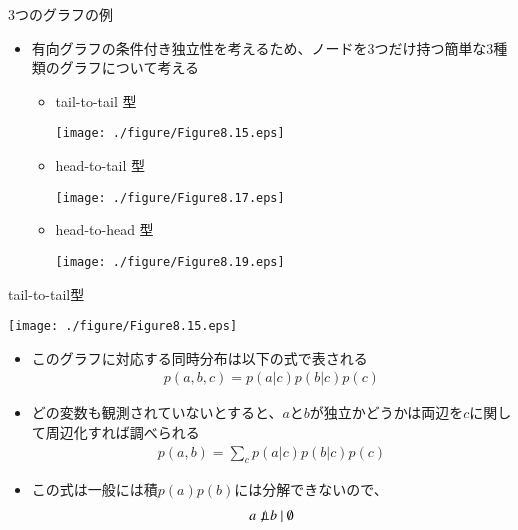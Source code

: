 \begin{frame}{3つのグラフの例}
 \begin{itemize}
  \item 有向グラフの条件付き独立性を考えるため、ノードを3つだけ持つ簡単な3種類のグラフについて考える
        \begin{itemize}
         \item tail-to-tail 型

               \texttt{[image: ./figure/Figure8.15.eps]}

         \item head-to-tail 型

               \texttt{[image: ./figure/Figure8.17.eps]}

         \item head-to-head 型

               \texttt{[image: ./figure/Figure8.19.eps]}

        \end{itemize}
 \end{itemize}
\end{frame}

\begin{frame}{tail-to-tail型}
 \begin{center}
  \texttt{[image: ./figure/Figure8.15.eps]}
 \end{center}
 \begin{itemize}
  \item このグラフに対応する同時分布は以下の式で表される
        \begin{eqnarray*}
         p(a,b,c) = p(a|c)p(b|c)p(c)
        \end{eqnarray*}
  \item どの変数も観測されていないとすると、$a$と$b$が独立かどうかは両辺を$c$に関して周辺化すれば調べられる
        \begin{eqnarray*}
         p(a,b) = \sum_c p(a|c)p(b|c)p(c)
        \end{eqnarray*}
  \item この式は一般には積$p(a)p(b)$には分解できないので、
        \begin{eqnarray*}
         a \nPerp\ b \ | \ \emptyset
        \end{eqnarray*}
 \end{itemize}
\end{frame}

